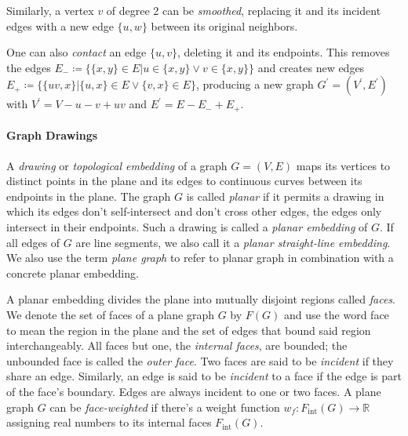 \begin{definition}
	Similarly, a vertex $v$ of degree 2 can be \emph{smoothed}, replacing it and its incident edges with a new edge $\{u,w\}$ between its original neighbors.
\end{definition}

\begin{definition}
	One can also \emph{contact} an edge $\{u,v\}$, deleting it and  its endpoints.
	This removes the edges $E_- \coloneqq \{ \{x,y\} \in E \vert u \in \{x,y\} \lor v \in \{x,y\} \}$ and creates new edges $E_+ \coloneqq \{ \{uv,x\} \vert \{u,x\} \in E \lor \{v,x\} \in E \}$, producing a new graph $G^\prime = (V^\prime, E^\prime)$ with $V^\prime = V - u - v + uv$ and $E^\prime = E - E_- + E_+$.
\end{definition}



\paragraph{Graph Drawings}

\begin{definition}
	A \emph{drawing} or \emph{topological embedding} of a graph $G = (V, E)$ maps its vertices to distinct points in the plane and its edges to continuous curves between its endpoints in the plane.
	The graph $G$ is called \emph{planar} if it permits a drawing in which its edges don't self-intersect and don't cross other edges, \ie{} the edges only intersect in their endpoints.
	Such a drawing is called a \emph{planar embedding} of $G$. If all edges of $G$ are line segments, we also call it a \emph{planar straight-line embedding}.
	We also use the term \emph{plane graph} to refer to planar graph in combination with a concrete planar embedding.
\end{definition}

\begin{definition}
	A planar embedding divides the plane into mutually disjoint regions called \emph{faces}. We denote the set of faces of a plane graph $G$ by $F(G)$ and use the word face to mean the region in the plane and the set of edges that bound said region interchangeably.
	All faces but one, the \emph{internal faces}, are bounded; the unbounded face is called the \emph{outer face}.
	Two faces are said to be \emph{incident} if they share an edge.
	Similarly, an edge is said to be \emph{incident} to a face if the edge is part of the face's boundary. Edges are always incident to one or two faces.
	A plane graph $G$ can be \emph{face-weighted} if there's a weight function $w_f \colon F_\text{int}(G) \to \mathbb{R}$ assigning real numbers to its internal faces $F_\text{int}(G)$.
\end{definition}

